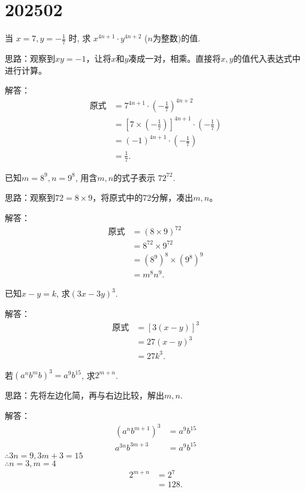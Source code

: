\section{202502}

\item{
    当 $ x=7, y=-\frac{1}{7}$ 时, 求 $x^{4n+1}\cdot y^{4n+2}$ ($n$为整数)的值.

    \fangsong{}
    思路：观察到$xy=-1$，让将$x$和$y$凑成一对，相乘。直接将$x, y$的值代入表达式中进行计算。
    
    解答：
    \begin{align*}
        \mbox{原式} &= 7^{4n+1}\cdot \left(-\frac{1}{7}\right) ^{4n+2}\\
        &= [7\times(-\frac{1}{7})]^{4n+1} \cdot(-\frac{1}{7})\\
        &= (-1)^{4n+1} \cdot(-\frac{1}{7})\\
        &= \frac{1}{7}.
    \end{align*}
} 
\item{
    已知$ m=8^9, n=9^8 $, 用含$m, n$的式子表示 $72^{72}$.

    \fangsong{}
    思路：观察到$72=8\times 9$，将原式中的72分解，凑出$m, n$。
    
    解答：
    \begin{align*}
        \mbox{原式} &= (8\times 9)^{72}\\
        &= 8^{72}\times 9^{72}\\
        &= (8^9)^8\times (9^8)^9\\
        &= m^8 n^9.
    \end{align*}
} 
\item{
    已知$x-y=k$, 求$(3x-3y)^3.$

    \fangsong{}
    解答：
    \begin{align*}
        \mbox{原式} &= [3(x-y)]^3\\
        &= 27(x-y)^3\\
        &= 27k^3.
    \end{align*}
} 
\item{
    若$(a^nb^mb)^3 = a^9 b^{15}$, 求$2^{m+n}$.

    \fangsong{}
    思路：先将左边化简，再与右边比较，解出$m,n$.
    
    解答：
    \begin{align*}
        (a^nb^{m+1})^3 &= a^9b^{15}\\
        a^{3n}b^{3m+3} &= a^9b^{15}
    \end{align*}
    $\therefore 3n=9, 3m+3=15$\\
    $\therefore n=3, m=4$
    \begin{align*}
        2^{m+n} &= 2^7\\
        &= 128.
    \end{align*}
}

